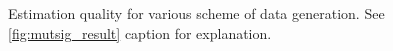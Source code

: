\begin{figure}[]\ContinuedFloat
  \centering
  \caption{Estimation quality for various scheme of data generation. See \cref{fig:mutsig_result} caption for explanation.}
  \label{fig:mutsig_result_appendix_4}
\end{figure}


